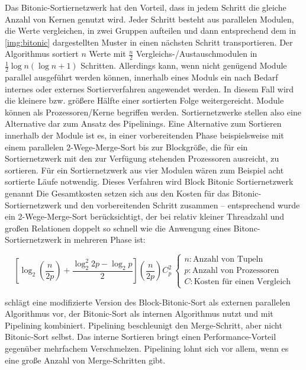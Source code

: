 \documentclass[a4paper,12pt,twoside]{article}
\begin{document}
Das Bitonic-Sortiernetzwerk \parencite[S. 335f]{Bitton1983} hat den Vorteil, dass in jedem Schritt die gleiche Anzahl von Kernen genutzt wird. Jeder Schritt besteht aus parallelen Modulen, die Werte vergleichen, in zwei Gruppen aufteilen und dann entsprechend dem in \autoref{img:bitonic} dargestellten Muster in einen nächsten Schritt transportieren. Der Algorithmus sortiert $n$ Werte mit $\frac {n} {2} $ Vergleichs-/Austauschmodulen in $\frac{1}{2} \log n (\log n +1)$ Schritten. Allerdings kann, wenn nicht genügend Module parallel ausgeführt werden können, innerhalb eines Moduls ein nach Bedarf internes oder externes Sortierverfahren angewendet werden. In diesem Fall wird die kleinere bzw. größere Hälfte einer sortierten Folge weitergereicht. Module können als Prozessoren/Kerne begriffen werden. Sortiernetzwerke stellen also eine Alternative dar zum Ansatz des Pipelinings. Eine Alternative zum Sortieren innerhalb der Module ist es, in einer vorbereitenden Phase beispielsweise mit einem parallelen 2-Wege-Merge-Sort bis zur Blockgröße, die für ein Sortiernetzwerk mit den zur Verfügung stehenden Prozessoren ausreicht, zu sortieren. Für ein Sortiernetzwerk aus vier Modulen wären zum Beispiel acht sortierte Läufe notwendig. Dieses Verfahren wird Block Bitonic Sortiernetzwerk genannt \parencite[S. 335]{Bitton1983}  Die Gesamtkosten setzen sich aus den Kosten für das Bitonic-Sortiernetzwerk und den vorbereitenden Schritt zusammen -- entsprechend \textcite[S. 335]{Bitton1983} wurde ein 2-Wege-Merge-Sort berücksichtigt, der bei relativ kleiner Threadzahl und großen Relationen doppelt so schnell wie die Anwengung eines Bitonc-Sortiernetzwerk in mehreren Phase ist:

\[
\left[ \log _2 (\frac {n} {2 p}) + \frac {\log _2 ^2 2 p - \log _2 p} {2} \right] ( \frac {n}{2 p}) C _{p} ^{2}\:
\begin{cases}
n: \text{Anzahl von Tupeln}\\
p: \text{Anzahl von Prozessoren}\\
C: \text{Kosten für einen Vergleich}
\end{cases}
\]

{\textcite{Menon1986}} schlägt eine modifizierte Version des Block-Bitonic-Sort als externen parallelen Algorithmus vor, der Bitonic-Sort als internen Algorithmus nutzt und mit Pipelining kombiniert. Pipelining beschleunigt den Merge-Schritt, aber nicht Bitonic-Sort selbst. Das interne Sortieren bringt einen Performance-Vorteil gegenüber mehrfachem Verschmelzen. Pipelining lohnt sich vor allem, wenn es eine große Anzahl von Merge-Schritten gibt.
\end{document}
